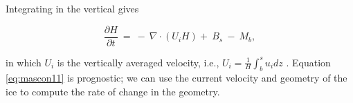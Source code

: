 \noindent
Integrating in the vertical gives

\begin{equation}
\frac{\partial H}{\partial t}~=~-~\nabla \cdot \left( U_{i} H \right) +~B_s~-~M_b,
\label{eq:mascon11}
\end{equation}

\noindent
in which $U_{i}$ is the vertically averaged velocity, i.e., $U_i = \frac{1}{H}\int_{b}^{s}u_{i}dz$ . Equation \eqref{eq:mascon11} is 
prognostic; we can use the current velocity and geometry of the ice to compute the rate of change in the geometry.
